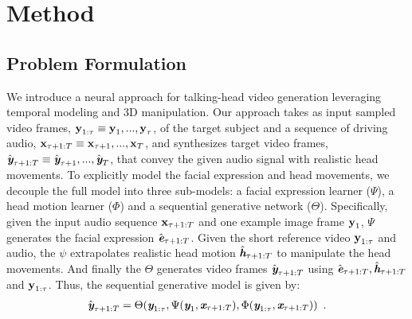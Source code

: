 \documentclass[runningheads]{llncs}
\def\mathbi#1{\textbf{\em #1}}
\providecommand{\CXu}[1]{\textcolor{red}{[{\bf #1}]}}
\begin{document}
\section{Method}
\label{sec:method}



\subsection{Problem Formulation}
\label{subsec:problem_formulation}

We introduce a neural approach for talking-head video generation leveraging temporal modeling and 3D manipulation. Our approach takes as input sampled video frames, $\mathbi{\mathbi{y}}_{1:\tau} \equiv \mathbi{\mathbi{y}}_1,...,\mathbi{\mathbi{y}}_{\tau}$, of the target subject and a sequence of driving audio, $\mathbi{\mathbi{x}}_{\tau+ 1:T}  \equiv \mathbi{\mathbi{x}}_{\tau + 1},...,\mathbi{\mathbi{x}}_T$, and synthesizes target video frames, $\hat{\mathbi{y}}_{\tau + 1:T}  \equiv \hat{\mathbi{y}}_{\tau + 1}, ...,\hat{\mathbi{y}}_T$, that convey the given audio signal with realistic head movements. To explicitly model the facial expression and head movements, we decouple the full model into three sub-models: a facial expression learner ($\Psi$), a head motion learner ($\Phi$) and a sequential generative network ($\Theta$). Specifically, given the input audio sequence $\mathbi{\mathbi{x}}_{\tau+ 1:T}$ and one example image frame $\mathbi{\mathbi{y}}_{1}$, $\Psi$ generates the facial expression $\hat{\mathbi{e}}_{\tau+1: T}$. Given the short reference video $\mathbi{\mathbi{y}}_{1:\tau}$ and audio, the $\psi$ extrapolates realistic head motion $\hat{\mathbi{h}}_{\tau + 1:T}$ to manipulate the head movements. And finally the $\Theta$ generates video frames $\hat{\mathbi{y}}_{\tau + 1:T}$ using $\hat{\mathbi{e}}_{\tau+1: T}, \hat{\mathbi{h}}_{\tau+1: T}$ and $\mathbi{\mathbi{y}}_{1:\tau}$.  Thus, the sequential generative model is given by:
\begin{equation}
\begin{aligned}
\hat{\mathbi{y}}_{ \tau+1:T} =  \Theta( \mathbi{y}_{1:\tau},\Psi( \mathbi{y}_{1} , \mathbi{x}_{\tau +1:T} ), \Phi(\mathbi{y}_{1:\tau},\mathbi{x}_{\tau +1:T} )  )  \enspace.
\end{aligned}
\label{eq:training}    
\end{equation}
\end{document}
